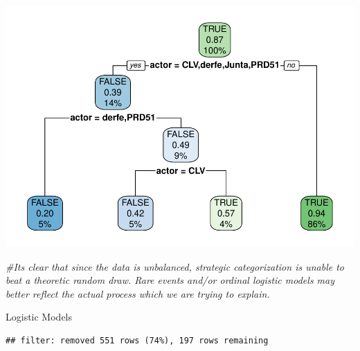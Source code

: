 \documentclass[
]{article}
\newenvironment{Shaded}{\begin{snugshade}}{\end{snugshade}}
\newcommand{\CommentTok}[1]{\textcolor[rgb]{0.56,0.35,0.01}{\textit{#1}}}
\newcommand{\DataTypeTok}[1]{\textcolor[rgb]{0.13,0.29,0.53}{#1}}
\newcommand{\FloatTok}[1]{\textcolor[rgb]{0.00,0.00,0.81}{#1}}
\newcommand{\KeywordTok}[1]{\textcolor[rgb]{0.13,0.29,0.53}{\textbf{#1}}}
\newcommand{\NormalTok}[1]{#1}
\newcommand{\OperatorTok}[1]{\textcolor[rgb]{0.81,0.36,0.00}{\textbf{#1}}}
\newcommand{\StringTok}[1]{\textcolor[rgb]{0.31,0.60,0.02}{#1}}
\begin{document}
\includegraphics{ProposalAnalysis_files/figure-latex/unnamed-chunk-10-1.pdf}

\begin{Shaded}
\begin{Highlighting}[]
\CommentTok{#Its clear that since the data is unbalanced, strategic categorization is unable to beat a theoretic random draw. Rare events and/or ordinal logistic models may better reflect the actual process which we are trying to explain.}
\end{Highlighting}
\end{Shaded}

Logistic Models

\begin{Shaded}
\end{Shaded}

\begin{verbatim}
## filter: removed 551 rows (74%), 197 rows remaining
\end{verbatim}

\begin{Shaded}
\end{Shaded}
\end{document}
